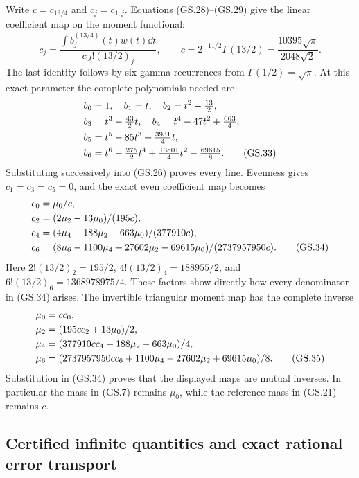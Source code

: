Write $c=c_{13/4}$ and $c_j=c_{1,j}$. Equations (GS.28)--(GS.29)
give the linear coefficient map on the moment functional:
\begin{equation}
 c_j=\frac{\int b_j^{(13/4)}(t)w(t)\dd t}
 {c\,j!(13/2)_j},\qquad
 c=2^{-11/2}\Gamma(13/2)=\frac{10395\sqrt\pi}{2048\sqrt2}.
 \tag{GS.32}
\end{equation}
The last identity follows by six gamma recurrences from
$\Gamma(1/2)=\sqrt\pi$. At this exact parameter the complete
polynomials needed are
\begin{align}
 b_0&=1,\quad b_1=t,\quad b_2=t^2-\tfrac{13}{2},\notag\\
 b_3&=t^3-\tfrac{43}{2}t,\quad
 b_4=t^4-47t^2+\tfrac{663}{4},\notag\\
 b_5&=t^5-85t^3+\tfrac{3931}{4}t,\notag\\
 b_6&=t^6-\tfrac{275}{2}t^4+\tfrac{13801}{4}t^2-\tfrac{69615}{8}.
 \tag{GS.33}
\end{align}
Substituting successively into (GS.26) proves every line.
Evenness gives $c_1=c_3=c_5=0$, and the exact even coefficient
map becomes
\begin{align}
 c_0&=\mu_0/c,\notag\\
 c_2&=(2\mu_2-13\mu_0)/(195c),\notag\\
 c_4&=(4\mu_4-188\mu_2+663\mu_0)/(377910c),\notag\\
 c_6&=(8\mu_6-1100\mu_4+27602\mu_2-69615\mu_0)/(2737957950c).
 \tag{GS.34}
\end{align}
Here $2!(13/2)_2=195/2$, $4!(13/2)_4=188955/2$,
and $6!(13/2)_6=1368978975/4$. These factors show directly
how every denominator in (GS.34) arises. The invertible triangular
moment map has the complete inverse
\begin{align}
 \mu_0&=c c_0,\notag\\
 \mu_2&=(195c c_2+13\mu_0)/2,\notag\\
 \mu_4&=(377910c c_4+188\mu_2-663\mu_0)/4,\notag\\
 \mu_6&=(2737957950c c_6+1100\mu_4-27602\mu_2+69615\mu_0)/8.
 \tag{GS.35}
\end{align}
Substitution in (GS.34) proves that the displayed maps are mutual
inverses. In particular the mass in (GS.7) remains $\mu_0$,
while the reference mass in (GS.21) remains $c$.

\subsection{Certified infinite quantities and exact rational error transport}

